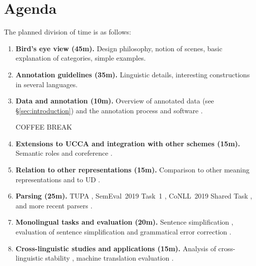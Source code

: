 \documentclass[11pt,a4paper,table]{article}
\begin{document}

\section{Agenda}\label{sec:agenda}

The planned division of time is as follows:

\begin{enumerate}
    \item \textbf{Bird's eye view (45m).}
    Design philosophy, notion of scenes, basic explanation of categories, simple examples.
    \item \textbf{Annotation guidelines (35m).}
    Linguistic details, interesting constructions
    in several languages.
    \item \textbf{Data and annotation (10m).}
    Overview of annotated data (see \S\ref{sec:introduction})
    and the annotation process and software \cite{abend2017uccaapp}.
    \begin{center}
        COFFEE BREAK
    \end{center}
    \item \textbf{Extensions to UCCA and integration with other schemes (15m).}
    Semantic roles \cite{prange2019made} and
    coreference \cite{prange2019semantically}.
    \item \textbf{Relation to other representations (15m).}
    Comparison to other meaning representations
    \cite{abend2017state,koller2019graph}
    and to UD \cite{hershcovich2019content}.
    \item \textbf{Parsing (25m).}
    TUPA \cite{hershcovich2017a,hershcovich2018multitask},
    SemEval~2019 Task~1 \cite{hershcovich2019shared,jiang-19},
    CoNLL~2019 Shared Task \cite{Oep:Abe:Haj:19}, and
    more recent parsers \cite{zhang2019broad}.
    \item \textbf{Monolingual tasks and evaluation (20m).}
    Sentence simplification \cite{sulem2018simple},
    evaluation of sentence simplification \cite{sulem2018samsa,alvamanchego-etal:2019:easse}
    and grammatical error correction \cite{choshen2018usim}.
    \item \textbf{Cross-linguistic studies and applications (15m).}
    Analysis of cross-linguistic stability \cite{sulem2015conceptual},
    machine translation evaluation \cite{birch2016hume,marecek-etal-2017-cuni}.
\end{enumerate}
\end{document}
